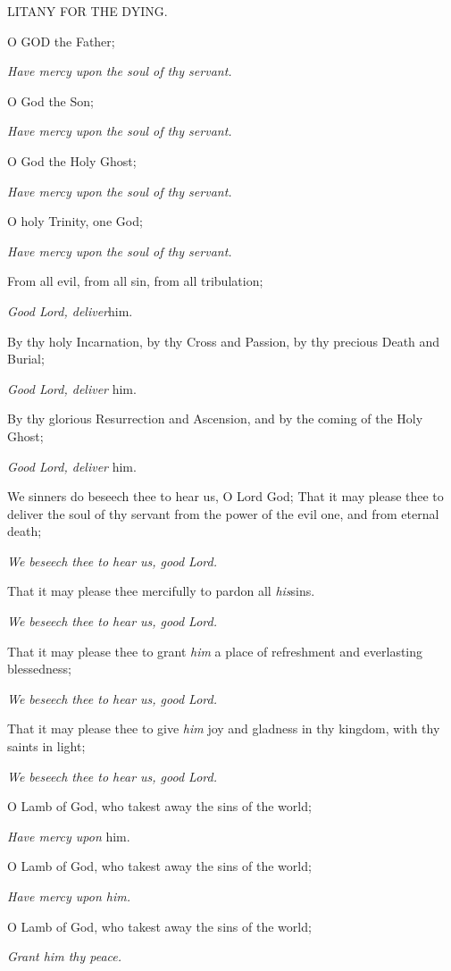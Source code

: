 LITANY FOR THE DYING.

O GOD the Father; 

\emph{Have mercy upon the soul of thy servant.}

O God the Son; 

\emph{Have mercy upon the soul of thy servant.}

O God the Holy Ghost; 

\emph{Have mercy upon the soul of thy servant.}

O holy Trinity, one God; 

\emph{Have mercy upon the soul of thy servant.}

From all evil, from all sin, from all tribulation;

\emph{Good Lord, deliver}him. 

By thy holy Incarnation, by thy Cross and Passion,
by thy precious Death and Burial; 

\emph{Good Lord, deliver} him. 

By thy glorious Resurrection and Ascension, and by
the coming of the Holy Ghost; 

\emph{Good Lord, deliver} him.

We sinners do beseech thee to hear us, O Lord God; That it may please
thee to deliver the soul of thy servant from the power of the evil one,
and from eternal death; 

\emph{We beseech thee to hear us, good Lord.}

That it may please thee mercifully to pardon all \emph{his}sins.

\emph{We beseech thee to hear us, good Lord.}

That it may please thee to grant \emph{him} a place
of refreshment and everlasting blessedness; 

\emph{We beseech thee to hear us, good Lord.}

That it may please thee to give \emph{him} joy and gladness in thy
kingdom, with thy saints in light; 

\emph{We beseech thee to hear us, good Lord.}

O Lamb of God, who takest away the sins of the world; 

\emph{Have mercy upon} him. 

O Lamb of God, who takest away the sins of the world;

\emph{Have mercy upon him.}

O Lamb of God, who takest away the sins of the world;

\emph{Grant him thy peace.}

